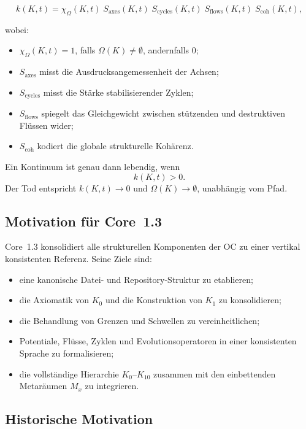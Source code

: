 \[
k(K,t) =
\chi_{\Omega}(K,t)\;
S_{\mathrm{axes}}(K,t)\;
S_{\mathrm{cycles}}(K,t)\;
S_{\mathrm{flows}}(K,t)\;
S_{\mathrm{coh}}(K,t),
\]

wobei:

\begin{itemize}
    \item \(\chi_{\Omega}(K,t)=1\), falls \(\Omega(K)\neq\emptyset\), andernfalls \(0\);
    \item \(S_{\mathrm{axes}}\) misst die Ausdrucksangemessenheit der Achsen;
    \item \(S_{\mathrm{cycles}}\) misst die Stärke stabilisierender Zyklen;
    \item \(S_{\mathrm{flows}}\) spiegelt das Gleichgewicht zwischen stützenden und destruktiven Flüssen wider;
    \item \(S_{\mathrm{coh}}\) kodiert die globale strukturelle Kohärenz.
\end{itemize}

Ein Kontinuum ist genau dann lebendig, wenn
\[
k(K,t) > 0.
\]
Der Tod entspricht \(k(K,t)\to 0\) und \(\Omega(K)\to\emptyset\), unabhängig vom Pfad.

\subsection{Motivation für Core~1.3}

Core~1.3 konsolidiert alle strukturellen Komponenten der OC zu einer vertikal konsistenten Referenz.  
Seine Ziele sind:

\begin{itemize}
    \item eine kanonische Datei- und Repository-Struktur zu etablieren;
    \item die Axiomatik von \(K_0\) und die Konstruktion von \(K_1\) zu konsolidieren;
    \item die Behandlung von Grenzen und Schwellen zu vereinheitlichen;
    \item Potentiale, Flüsse, Zyklen und Evolutionsoperatoren in einer konsistenten Sprache zu formalisieren;
    \item die vollständige Hierarchie \(K_0\)–\(K_{10}\) zusammen mit den einbettenden Metaräumen \(M_x\) zu integrieren.
\end{itemize}

\subsection{Historische Motivation}

